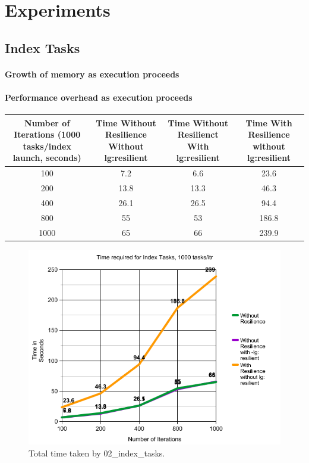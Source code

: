 
\section{Experiments}

\subsection{Index Tasks}

\paragraph{Growth of memory as execution proceeds}
\paragraph{Performance overhead as execution proceeds}



\begin{center}
 \begin{tabular}{||c c c c||} 
 \hline
 Number of Iterations (1000 tasks/index launch, seconds) & Time Without Resilience Without lg:resilient & Time Without Resilienct With lg:resilient & Time With Resilience without lg:resilient \\ [0.25ex] 
 \hline\hline
100 &  7.2 & 6.6 & 23.6\\ 
 \hline
200 &  13.8 & 13.3 & 46.3\\ 
 \hline
400 &  26.1 & 26.5 & 94.4\\ 
 \hline
800 &  55 & 53 & 186.8\\ 
 \hline
1000 &  65 & 66 & 239.9\\ [1ex] 
 \hline
\end{tabular}
\end{center}

\begin{figure}
\includegraphics[width=\textwidth]{images/index_tasks_time.png}
\caption{Total time taken by 02\_index\_tasks.}
\end{figure}


